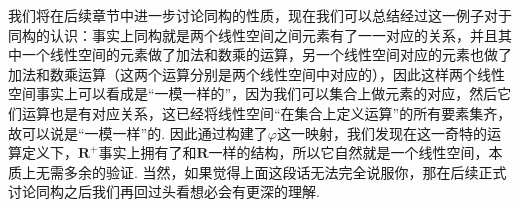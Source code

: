 我们将在后续章节中进一步讨论同构的性质，现在我们可以总结经过这一例子对于同构的认识：事实上同构就是两个线性空间之间元素有了一一对应的关系，并且其中一个线性空间的元素做了加法和数乘的运算，另一个线性空间对应的元素也做了加法和数乘运算（这两个运算分别是两个线性空间中对应的），因此这样两个线性空间事实上可以看成是``一模一样的''，因为我们可以集合上做元素的对应，然后它们运算也是有对应关系，这已经将线性空间``在集合上定义运算''的所有要素集齐，故可以说是``一模一样''的. 因此通过构建了$\varphi$这一映射，我们发现在这一奇特的运算定义下，$\mathbf{R}^+$事实上拥有了和$\mathbf{R}$一样的结构，所以它自然就是一个线性空间，本质上无需多余的验证. 当然，如果觉得上面这段话无法完全说服你，那在后续正式讨论同构之后我们再回过头看想必会有更深的理解.



